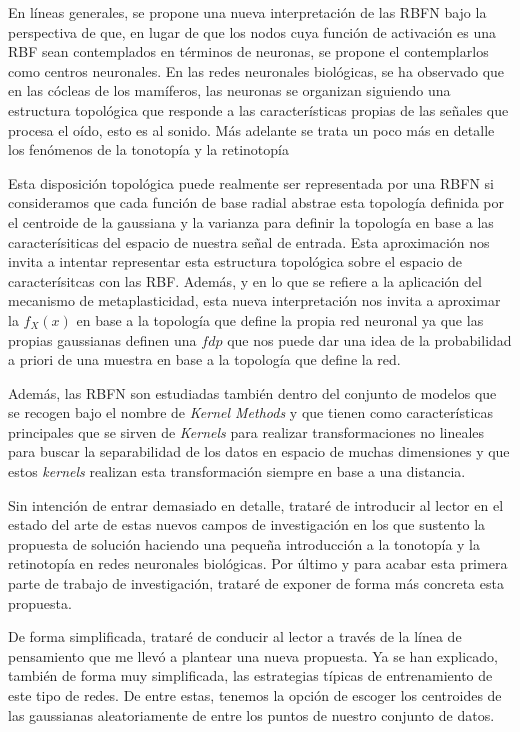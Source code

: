 \documentclass[10pt,a4paper]{report}
\begin{document}
En líneas generales, se propone una nueva interpretación de las RBFN bajo la perspectiva de que, en lugar de que los nodos cuya función de activación es una RBF sean contemplados en términos de neuronas, se propone el contemplarlos como centros neuronales. En las redes neuronales biológicas, se ha observado que en las cócleas de los mamíferos, las neuronas se organizan siguiendo una estructura topológica que responde a las características propias de las señales que procesa el oído, esto es al sonido. Más adelante se trata un poco más en detalle los fenómenos de la tonotopía y la retinotopía

Esta disposición topológica puede realmente ser representada por una RBFN si consideramos que cada función de base radial abstrae esta topología definida por el centroide de la gaussiana y la varianza para definir la topología en base a las caracterísiticas del espacio de nuestra señal de entrada. Esta aproximación nos invita a intentar representar esta estructura topológica sobre el espacio de caracterísitcas con las RBF. Además, y en lo que se refiere a la aplicación del mecanismo de metaplasticidad, esta nueva interpretación nos invita a aproximar la $f_X(x)$ en base a la topología que define la propia red neuronal ya que las propias gaussianas definen una $fdp$ que nos puede dar una idea de la probabilidad a priori de una muestra en base a la topología que define la red.

Además, las RBFN son estudiadas también dentro del conjunto de modelos que se recogen bajo el nombre de \textit{Kernel Methods} y que tienen como características principales que se sirven de \textit{Kernels} para realizar transformaciones no lineales para buscar la separabilidad de los datos en espacio de muchas dimensiones y que estos \textit{kernels} realizan esta transformación siempre en base a una distancia.

Sin intención de entrar demasiado en detalle, trataré de introducir al lector en el estado del arte de estas nuevos campos de investigación en los que sustento la propuesta de solución haciendo una pequeña introducción a la tonotopía y la retinotopía en redes neuronales biológicas. Por último y para acabar esta primera parte de trabajo de investigación, trataré de exponer de forma más concreta esta propuesta.

De forma simplificada, trataré de conducir al lector a través de la línea de pensamiento que me llevó a plantear una nueva propuesta. Ya se han explicado, también de forma muy simplificada, las estrategias típicas de entrenamiento de este tipo de redes. De entre estas, tenemos la opción de escoger los centroides de las gaussianas aleatoriamente de entre los puntos de nuestro conjunto de datos.
\end{document}

